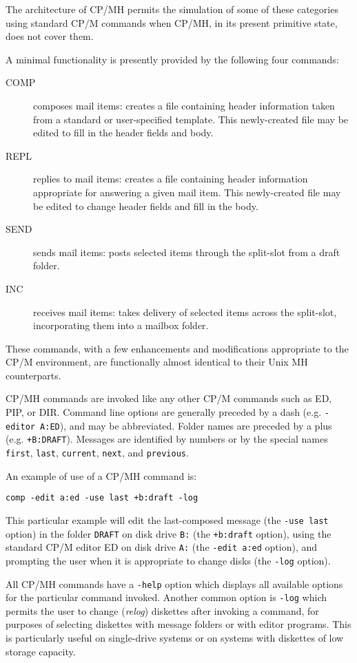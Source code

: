 \medskip
The architecture of CP/MH permits the simulation of some of these
categories using standard CP/M commands when CP/MH, in its present
primitive state, does not cover them.

A minimal functionality is presently provided by the following four commands:
\medskip
\begin{description}
\item[COMP]
composes mail items:
creates a file containing header information taken 
from a standard or user-specified template.  
This newly-created file may be edited to fill in
the header fields and body.
\item[REPL]
replies to mail items:
creates a file containing header
information appropriate for answering a given mail item.
This newly-created file may be edited to
change header fields and fill in the body.
\item[SEND]
sends mail items:
posts selected items through the split-slot from a draft folder.
\item[INC]
receives mail items:
takes delivery of selected items
across the split-slot, incorporating
them into a mailbox folder.
\end{description}
\medskip
These commands, with a few enhancements and modifications
appropriate to the CP/M environment, are functionally almost
identical to their Unix MH counterparts.

CP/MH commands are invoked like any other 
CP/M commands such as ED, PIP, or DIR.  
Command line options are generally preceded by a dash 
(e.g. {\tt -editor A:ED}), and may be abbreviated.  
Folder names are preceded by a plus (e.g. {\tt +B:DRAFT}).
Messages are identified by numbers or by the special names {\tt first},
{\tt last}, {\tt current}, {\tt next}, and {\tt previous}.

An example of use of a CP/MH command is:  

\begin{flushleft}
\hspace{1in} {\tt comp -edit a:ed -use last +b:draft -log}
\end{flushleft}

This particular example will edit the last-composed message (the
{\tt -use last} option) in the folder {\tt DRAFT} on disk drive {\tt B:}
(the {\tt +b:draft} option), using the standard CP/M editor ED on disk
drive {\tt A:} (the {\tt -edit a:ed} option), and prompting the user when
it is appropriate to change disks (the {\tt -log} option).

All CP/MH commands have a {\tt -help} option which displays all
available options for the particular command invoked.
Another common option is {\tt -log} which permits the user to change
({\it relog}) diskettes after invoking a command, for purposes of
selecting diskettes with message folders or with editor programs.
This is particularly useful on single-drive systems or on systems
with diskettes of low storage capacity.


